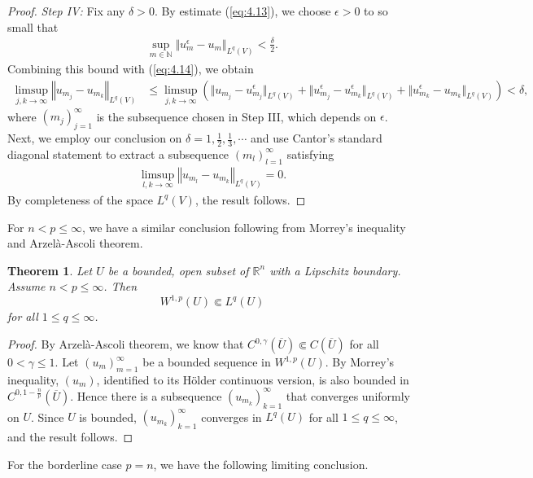 \documentclass{article}
\numberwithin{equation}{section}
\newcommand{\bbN}{\mathbb{N}}
\newcommand{\bbR}{\mathbb{R}}
\newcommand{\ol}{\overline}
\theoremstyle{plain}
\newtheorem{theorem}{Theorem}[section]
\theoremstyle{definition}
\begin{document}
\begin{proof}
\textit{Step IV:} Fix any $\delta>0$. By estimate (\ref{eq:4.13}), we choose $\epsilon>0$ to so small that
\begin{align*}
	\sup_{m\in\bbN}\Vert u_m^\epsilon-u_m\Vert_{L^q(V)}<\frac{\delta}{2}.
\end{align*}
Combining this bound with (\ref{eq:4.14}), we obtain
\begin{align*}
	\limsup_{j,k\to\infty}\left\Vert u_{m_j}-u_{m_k}\right\Vert_{L^q(V)}&\leq\limsup_{j,k\to\infty}\left(\bigl\Vert u_{m_j}-u_{m_j}^\epsilon\bigr\Vert_{L^q(V)}+\bigl\Vert u_{m_j}^\epsilon-u_{m_k}^\epsilon\bigr\Vert_{L^q(V)}+\bigl\Vert u_{m_k}^\epsilon-u_{m_k}\bigr\Vert_{L^q(V)}\right)
	<\delta,
\end{align*}
where $(m_j)_{j=1}^\infty$ is the subsequence chosen in Step III, which depends on $\epsilon$. Next, we employ our conclusion on $\delta=1,\frac{1}{2},\frac{1}{3},\cdots$ and use Cantor's standard diagonal statement to extract a subsequence $(m_l)_{l=1}^\infty$ satisfying
\begin{align*}
	\limsup_{l,k\to\infty}\left\Vert u_{m_l}-u_{m_k}\right\Vert_{L^q(V)}=0.
\end{align*}
By completeness of the space $L^q(V)$, the result follows.
\end{proof}

For $n<p\leq\infty$, we have a similar conclusion following from Morrey's inequality and Arzelà-Ascoli theorem.
\begin{theorem}\label{thm:4.17}
Let $U$ be a bounded, open subset of $\bbR^n$ with a Lipschitz boundary. Assume $n<p\leq\infty$. Then $$W^{1,p}(U)\Subset L^q(U)$$ for all $1\leq q\leq\infty$.
\end{theorem}
\begin{proof}
By Arzelà-Ascoli theorem, we know that $C^{0,\gamma}(\ol{U})\Subset C(\ol{U})$ for all $0<\gamma\leq 1$. Let $(u_m)_{m=1}^\infty$ be a bounded sequence in $W^{1,p}(U)$. By Morrey's inequality, $(u_m)$, identified to its Hölder continuous version, is also bounded in $C^{0,1-\frac{n}{p}}(\ol{U})$. Hence there is a subsequence $(u_{m_k})_{k=1}^\infty$ that converges uniformly on $U$. Since $U$ is bounded, $(u_{m_k})_{k=1}^\infty$ converges in $L^q(U)$ for all $1\leq q\leq\infty$, and the result follows.
\end{proof}

For the borderline case $p=n$, we have the following limiting conclusion.
\end{document}
